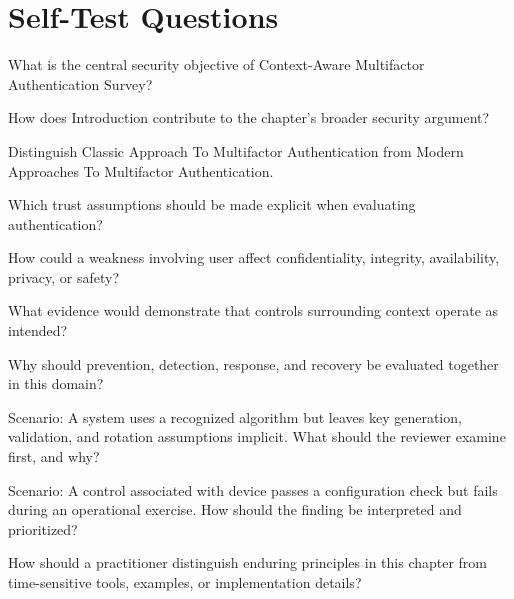 \documentclass[11pt,letterpaper]{article}
\begin{document}
\section*{Self-Test Questions}
\begin{CornellRecallList}
\item What is the central security objective of Context-Aware Multifactor Authentication Survey?
\item How does Introduction contribute to the chapter's broader security argument?
\item Distinguish Classic Approach To Multifactor Authentication from Modern Approaches To Multifactor Authentication.
\item Which trust assumptions should be made explicit when evaluating authentication?
\item How could a weakness involving user affect confidentiality, integrity, availability, privacy, or safety?
\item What evidence would demonstrate that controls surrounding context operate as intended?
\item Why should prevention, detection, response, and recovery be evaluated together in this domain?
\item Scenario: A system uses a recognized algorithm but leaves key generation, validation, and rotation assumptions implicit. What should the reviewer examine first, and why?
\item Scenario: A control associated with device passes a configuration check but fails during an operational exercise. How should the finding be interpreted and prioritized?
\item How should a practitioner distinguish enduring principles in this chapter from time-sensitive tools, examples, or implementation details?
\end{CornellRecallList}
\end{document}

